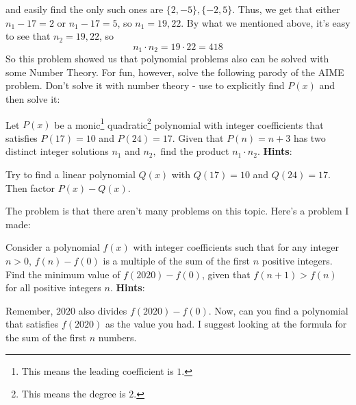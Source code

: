 \documentclass[11pt,titlepage]{scrartcl}
\newenvironment{hint}{\footnotesize \normalfont \textbf{Hints}:}{\hspace{-0.5ex}}
\begin{document}
and easily find the only such ones are $\{2,-5\},\{-2,5\}$. Thus, we get that either $n_1-17=2$ or $n_1-17=5$, so $n_1=19,22$. By what we mentioned above, it's easy to see that $n_2=19,22$, so
\[n_1\cdot n_2=19\cdot 22=\boxed{418}\]
So this problem showed us that polynomial problems also can be solved with some Number Theory. For fun, however, solve the following parody of the AIME problem. Don't solve it with number theory - use  to explicitly find $P(x)$ and then solve it:
\begin{exercisebox}
\begin{exercise}
Let $P(x)$ be a monic\footnote{This means the leading coefficient is $1$.} quadratic\footnote{This means the degree is $2$.} polynomial with integer coefficients that satisfies $P(17)=10$ and $P(24)=17.$ Given that $P(n)=n+3$ has two distinct integer solutions $n_1$ and $n_2,$ find the product $n_1\cdot n_2.$
\begin{hint}
\begin{addhint}{
Try to find a linear polynomial $Q(x)$ with $Q(17)=10$ and $Q(24)=17$. Then factor $P(x)-Q(x)$.
}\end{addhint}
\end{hint}
\end{exercise}
The problem is that there aren't many problems on this topic. Here's a problem I made:
\begin{exercise}
Consider a polynomial $f(x)$ with integer coefficients such that for any integer $n>0$, $f(n)-f(0)$ is a multiple of the sum of the first $n$ positive integers. Find the minimum value of $f(2020)-f(0)$, given that $f(n+1)>f(n)$ for all positive integers $n$.
\begin{hint}
\begin{addhint}{
Remember, $2020$ also divides $f(2020)-f(0)$. Now, can you find a polynomial that satisfies $f(2020)$ as the value you had. I suggest looking at the formula for the sum of the first $n$ numbers.
}\end{addhint}
\end{hint}
\end{exercise}
\end{exercisebox}
\end{document}
